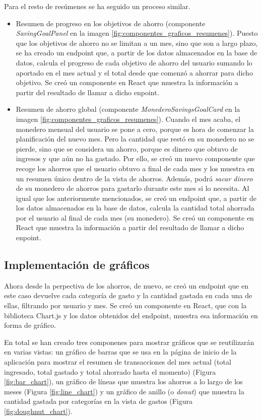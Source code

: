 Para el resto de resúmenes se ha seguido un proceso similar. 

\begin{itemize}
    \item Resumen de progreso en los objetivos de ahorro (componente \textit{SavingGoalPanel} en la imagen \ref{fig:componentes_graficos_resumenes}). Puesto que los objetivos de ahorro no se limitan a un mes, sino que son a largo plazo, se ha creado un endpoint que, a partir de los datos almacenados en la base de datos, calcula el progreso de cada objetivo de ahorro del usuario sumando lo aportado en el mes actual y el total desde que comenzó a ahorrar para dicho objetivo. Se creó un componente en React que muestra la información a partir del resultado de llamar a dicho enpoint.
    \item Resumen de ahorro global (componente \textit{MonederoSavingsGoalCard} en la imagen \ref{fig:componentes_graficos_resumenes}). Cuando el mes acaba, el monedero mensual del usuario se pone a cero, porque es hora de comenzar la planificación del nuevo mes. Pero la cantidad que restó en su monedero no se pierde, sino que se considera un ahorro, porque es dinero que obtuvo de ingresos y que aún no ha gastado. Por ello, se creó un nuevo componente que recoge los ahorros que el usuario obtuvo a final de cada mes y los muestra en un resumen único dentro de la vista de ahorros. Además, podrá \textit{sacar dinero} de su monedero de ahorros para gastarlo durante este mes si lo necesita. Al igual que los anteriormente mencionados, se creó un endpoint que, a partir de los datos almacenados en la base de datos, calcula la cantidad total ahorrada por el usuario al final de cada mes (su monedero). Se creó un componente en React que muestra la información a partir del resultado de llamar a dicho enpoint.

\end{itemize}


\subsection{Implementación de gráficos}
Ahora desde la perpectiva de los ahorros, de nuevo, se creó un endpoint que en este caso devuelve cada categoría de gasto y la cantidad gastada en cada una de ellas, filtrando por usuario y mes. Se creó un componente en React, que con la biblioteca Chart.js y los datos obtenidos del endpoint, muestra esa información en forma de gráfico.

En total se han creado tres componenes para mostrar gráficos que se reutilizarán en varias vistas: un gráfico de barras que se usa en la página de inicio de la aplicación para mostrar el resumen de transacciones del mes actual (total ingresado, total gastado y total ahorrado hasta el momento) (Figura \ref{fig:bar_chart}), un gráfico de líneas que muestra los ahorros a lo largo de los meses (Figura \ref{fig:line_chart}) y un gráfico de anillo (o \textit{donut}) que muestra la cantidad gastada por categorías en la vista de gastos (Figura \ref{fig:doughnut_chart}). 

